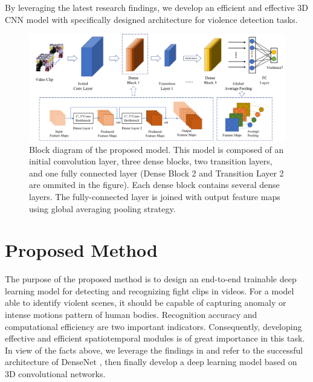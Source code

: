 \documentclass[10pt,twocolumn,letterpaper]{article}
\begin{document}
By leveraging the latest research findings, we develop an efficient and effective 3D CNN model with specifically designed architecture for violence detection tasks.



\begin{figure}
\begin{center}
\includegraphics[scale=0.52]{fig/fig1.png}
\end{center}
\caption{Block diagram of the proposed model. This model is composed of an initial convolution layer, three dense blocks, two transition layers, and one fully connected layer (Dense Block 2 and Transition Layer 2 are ommited in the figure). Each dense block contains several dense layers. The fully-connected layer is joined with output feature maps using global averaging pooling strategy.}
\label{fig:model}
\end{figure}
	
	

\section{Proposed Method}
\label{sec:3}

The purpose of the proposed method is to design an end-to-end trainable deep learning model for detecting and recognizing fight clips in videos. 
For a model able to identify violent scenes, it should be capable of capturing anomaly or intense motions pattern of human bodies. 
Recognition accuracy and computational efficiency are two important indicators.
Consequently, developing effective and efficient spatiotemporal modules is of great importance in this task.
In view of the facts above, we leverage the findings in \cite{3dcnn_1, 3dcnn_2, r2+1d} and refer to the successful architecture of DenseNet \cite{densenet}, then finally develop a deep learning model based on 3D convolutional networks.
\end{document}
